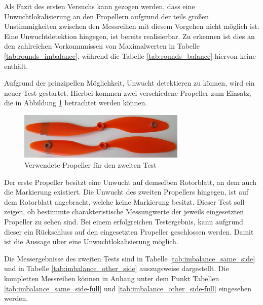 Als Fazit des ersten Versuchs kann gezogen werden, dass eine Unwuchtlokalisierung an den Propellern aufgrund der teils großen Unstimmigkeiten zwischen den Messreihen mit diesem Vorgehen nicht möglich ist.
Eine Unwuchtdetektion hingegen, ist bereits realisierbar.
Zu erkennen ist dies an den zahlreichen Vorkommnissen von Maximalwerten in Tabelle \ref{tab:rounds_imbalance}, während die Tabelle \ref{tab:rounds_balance} hiervon keine enthält.

Aufgrund der prinzipellen Möglichkeit, Unwucht detektieren zu können, wird ein neuer Test gestartet.
Hierbei kommen zwei verschiedene Propeller zum Einsatz, die in Abbildung \ref{fig:test_two_propellers} betrachtet werden können.

\begin{figure}[H]
	\centering
	\includegraphics[width=8cm]{images/chapter/03/test_two_propellers.jpeg}
	\caption{Verwendete Propeller für den zweiten Test}
	\label{fig:test_two_propellers}
\end{figure}

Der erste Propeller besitzt eine Unwucht auf demselben Rotorblatt, an dem auch die Markierung existiert.
Die Unwucht des zweiten Propellers hingegen, ist auf dem Rotorblatt angebracht, welche keine Markierung besitzt.
Dieser Test soll zeigen, ob bestimmte charakteristische Messungwerte der jeweils eingesetzten Propeller zu sehen sind.
Bei einem erfolgreichen Testergebnis, kann aufgrund dieser ein Rückschluss auf den eingesetzten Propeller geschlossen werden.
Damit ist die Aussage über eine Unwuchtlokalisierung möglich.

Die Messergebnisse des zweiten Tests sind in Tabelle \ref{tab:imbalance_same_side} und in Tabelle \ref{tab:imbalance_other_side} auszugsweise dargestellt.
Die kompletten Messreihen können in Anhang unter dem Punkt Tabellen \ref{tab:imbalance_same_side-full} und \ref{tab:imbalance_other_side-full} eingesehen werden.

\begin{table}[H]
\centering
{}
\caption{Messergebnisse mit Unwucht auf Seite mit Markierung}
\label{tab:imbalance_same_side}
\end{table}

